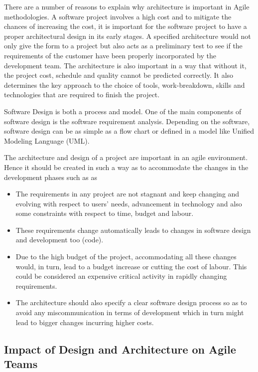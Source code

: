 \documentclass[sigplan,screen]{acmart}
\begin{document}
There are a number of reasons to explain why architecture is important in Agile methodologies. A software project involves a high cost and to mitigate the chances of increasing the cost, it is important for the software project to have a proper architectural design in its early stages. A specified architecture would not only give the form to a project but also acts as a preliminary test to see if the requirements of the customer have been properly incorporated by the development team. The architecture is also important in a way that without it, the project cost, schedule and quality cannot be predicted correctly. It also determines the key approach to the choice of tools, work-breakdown, skills and technologies that are required to finish the project.

Software Design is both a process and model. One of the main components of software design is the software requirement analysis. Depending on the software, software design can be as simple as a flow chart or defined in a model like Unified Modeling Language (UML). 

The architecture and design of a project are important in an agile environment. Hence it should be created in such a way as to accommodate the changes in the development phases such as as\cite{Architecture04}

\begin{itemize}
\item {}The requirements in any project are not stagnant and keep changing and evolving with respect to users’ needs, advancement in technology and also some constraints with respect to time, budget and labour.
\item {}These requirements change automatically leads to changes in software design and development too (code).
\item {}Due to the high budget of the project, accommodating all these changes would, in turn, lead to a budget increase or cutting the cost of labour. This could be considered an expensive critical activity in rapidly changing requirements.
\item {}The architecture should also specify a clear software design process so as to avoid any miscommunication in terms of development which in turn might lead to bigger changes incurring higher costs.
\end{itemize}


\subsection{Impact of Design and Architecture on Agile Teams}
\end{document}
